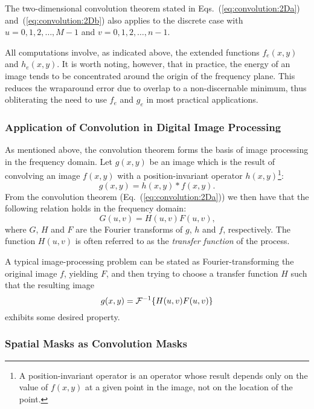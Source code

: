 The two-dimensional convolution theorem stated in
Eqs.~(\ref{eq:convolution:2Da}) and~(\ref{eq:convolution:2Db}) also
applies to the discrete case with $u=0,1,2,\ldots,M-1$ and
$v=0,1,2,\ldots,n-1$.  

All computations involve, as indicated above, the extended functions
$f_{e}(x,y)$ and $h_{e}(x,y)$.  It is worth noting, however, that in
practice, the energy of an image tends to be concentrated around the
origin of the frequency plane.  This reduces the wraparound error due
to overlap to a non-discernable minimum, thus obliterating the need to
use $f_{e}$ and $g_{e}$ in most practical applications.

\subsubsection{Application of Convolution in Digital Image Processing}

As mentioned above, the convolution theorem forms the basis of image
processing in the frequency domain.  Let $g(x,y)$ be an image which is
the result of convolving an image $f(x,y)$ with a position-invariant
operator $h(x,y)$\footnote{A position-invariant operator is an
  operator whose result depends only on the value of $f(x,y)$ at a
  given point in the image, not on the location of the point.}:
\begin{equation}
\label{eq:convolution:operator}
  g(x,y)=h(x,y)\ast f(x,y)\mbox{.}
\end{equation}
From the convolution theorem (Eq.~(\ref{eq:convolution:2Da})) we then
have that the following relation holds in the frequency domain:
\begin{equation}
  G(u,v)=H(u,v)F(u,v)\mbox{,}
\end{equation}
where $G$, $H$ and $F$ are the Fourier transforms of $g$, $h$ and $f$,
respectively.  The function $H(u,v)$ is often referred to as the {\em
  transfer function\/} of the process.

A typical image-processing problem can be stated as
Fourier-transforming the original image $f$, yielding $F$, and then
trying to choose a transfer function $H$ such that the resulting image
\begin{equation}
  g(x,y)={\cal F}^{-1}\{H(u,v)F(u,v)\}
\end{equation}
exhibits some desired property.

\subsubsection{Spatial Masks as Convolution Masks}
\label{pg:convolutionmasks}

